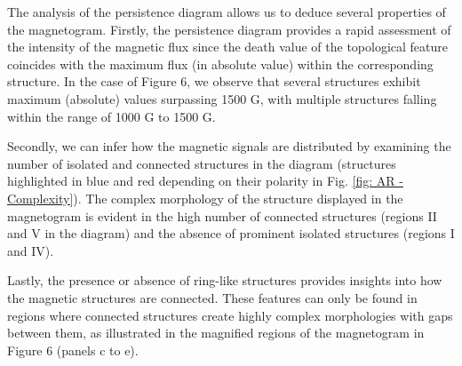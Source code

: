 The analysis of the persistence diagram allows us to deduce several properties of the magnetogram. Firstly, the persistence diagram provides a rapid assessment of the intensity of the magnetic flux since the death value of the topological feature coincides with the maximum flux (in absolute value) within the corresponding structure. In the case of Figure 6, we observe that several structures exhibit maximum (absolute) values surpassing 1500 G, with multiple structures falling within the range of 1000 G to 1500 G.

Secondly, we can infer how the magnetic signals are distributed by examining the number of isolated and connected structures in the diagram (structures highlighted in blue and red depending on their polarity in Fig. \ref{fig:  AR - Complexity}). The complex morphology of the structure displayed in the magnetogram is evident in the high number of connected structures (regions II and V in the diagram) and the absence of prominent isolated structures (regions I and IV).

Lastly, the presence or absence of ring-like structures provides insights into how the magnetic structures are connected. These features can only be found in regions where connected structures create highly complex morphologies with gaps between them, as illustrated in the magnified regions of the magnetogram in Figure 6 (panels c to e).

